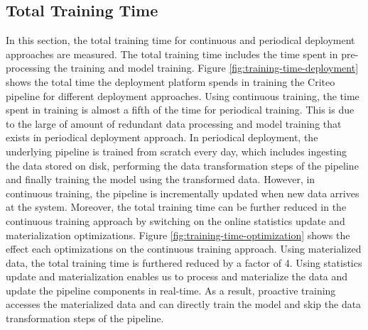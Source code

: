 \subsection{Total Training Time}
In this section, the total training time for continuous and periodical deployment approaches are measured.
The total training time includes the time spent in pre-processing the training and model training.
Figure \ref{fig:training-time-deployment} shows the total time the deployment platform spends in training the Criteo pipeline for different deployment approaches.
Using continuous training, the time spent in training is almost a fifth of the time for periodical training.
This is due to the large of amount of redundant data processing and model training that exists in periodical deployment approach.
In periodical deployment, the underlying pipeline is trained from scratch every day, which includes ingesting the data stored on disk, performing the data transformation steps of the pipeline and finally training the model using the transformed data.
However, in continuous training, the pipeline is incrementally updated when new data arrives at the system.
Moreover, the total training time can be further reduced in the continuous training approach by switching on the online statistics update and materialization optimizations.
Figure \ref{fig:training-time-optimization} shows the effect each optimizations on the continuous training approach.
Using materialized data, the total training time is furthered reduced by a factor of 4.
Using statistics update and materialization enables us to process and materialize the data and update the pipeline components in real-time.
As a result, proactive training accesses the materialized data and can directly train the model and skip the data transformation steps of the pipeline.

